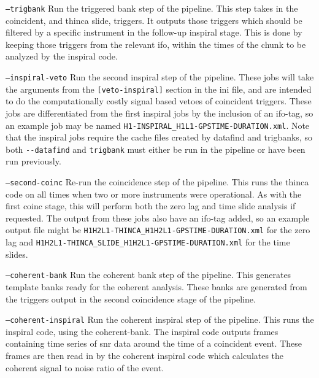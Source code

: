 \begin{entry}
\begin{entry}
\item[\texttt{--trigbank}] Run the triggered bank step of the pipeline.  This
step takes in the coincident, and thinca slide, triggers.  It outputs those
triggers which should be filtered by a specific instrument in the follow-up
inspiral stage.  This is done by keeping those triggers from the relevant ifo,
within the times of the chunk to be analyzed by the inspiral code.
\end{entry}

\begin{entry}
\item[\texttt{--inspiral-veto}] Run the second inspiral step of the pipeline.
These jobs will take the arguments from the \verb$[veto-inspiral]$ section in
the ini file, and are intended to do the computationally costly signal based
vetoes of coincident triggers.  These jobs are differentiated from the first
inspiral jobs by the inclusion of an ifo-tag, so an example job may be named
\verb$H1-INSPIRAL_H1L1-GPSTIME-DURATION.xml$.  Note that the inspiral jobs
require the cache files created by datafind and trigbanks, so both
\verb$--datafind$ and \verb$trigbank$ must either be run in the pipeline or
have been run previously.
\end{entry}

\begin{entry} 
\item[\texttt{--second-coinc}] Re-run the coincidence step of the pipeline.
This runs the thinca code on all times when two or more instruments were
operational.  As with the first coinc stage, this will perform both the zero
lag and time slide analysis if requested.  The output from these jobs also
have an ifo-tag added, so an example output file might be
\verb$H1H2L1-THINCA_H1H2L1-GPSTIME-DURATION.xml$ for the zero lag and
\verb$H1H2L1-THINCA_SLIDE_H1H2L1-GPSTIME-DURATION.xml$ for the time slides.
\end{entry} 

\begin{entry} 
\item[\texttt{--coherent-bank}] Run the coherent bank step of the pipeline.
This generates template banks ready for the coherent analysis.  These banks
are generated from the triggers output in the second coincidence stage of the
pipeline.
\end{entry} 


\begin{entry} 
\item[\texttt{--coherent-inspiral}] Run the coherent inspiral step of the
pipeline.  This runs the inspiral code, using the coherent-bank.  The inspiral
code outputs frames containing time series of snr data around the time of a
coincident event.  These frames are then read in by the coherent inspiral code
which calculates the coherent signal to noise ratio of the event.
\end{entry} 



\end{entry}
